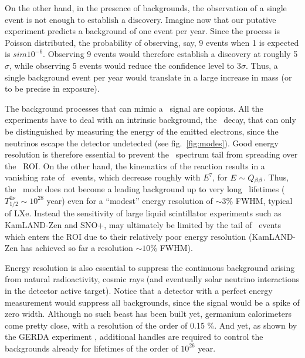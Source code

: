 
On the other hand, in the presence of backgrounds, the observation of a single event is not enough to establish a discovery. Imagine now that our putative  experiment predicts a background of one event per year. Since the process is Poisson distributed, the probability of observing, say, 9 events when 1 is expected is $sim 10^{-6}$. Observing 9 events would therefore establish a discovery at roughly 5$\sigma$, while observing 5 events would reduce the confidence level to 
 3$\sigma$. Thus, a single background event per year would translate in a large increase in mass (or to be precise in exposure).
 
 The background processes that can mimic a \bbonu\ signal 
 are copious. All the experiments have to deal with an intrinsic background, the \bbtnu\ decay, that can only be distinguished by measuring the energy of the emitted electrons, since the neutrinos escape the detector undetected (see fig.~\ref{fig:modes}). Good energy resolution is therefore essential to prevent the \bbtnu\ spectrum tail from spreading over the \bbonu\ ROI. On the other hand, the kinematics of the reaction results in a vanishing rate of \bbtnu\ events, which decrease roughly with $E^7$, for $E \sim Q_{\beta\beta}$. Thus, the \bbtnu\ mode does not become a leading background up to very long \bbonu\ lifetimes  ($T_{1/2}^{0\nu} \sim 10^{28}$ year) even for a ``modest'' energy resolution of $\sim 3\%$ FWHM, typical of LXe. Instead the sensitivity of large liquid scintillator experiments such as KamLAND-Zen and SNO+, may ultimately be limited by the tail of \bbtnu\ events which enters the ROI due to their relatively poor energy resolution (KamLAND-Zen has achieved so far a resolution $\sim 10\%$ FWHM).
 
Energy resolution is also essential to suppress the continuous background arising from natural radioactivity, cosmic rays (and eventually solar neutrino interactions in the detector active target). Notice that a detector with a perfect energy measurement would suppress all backgrounds, since the signal would be a spike of zero width. Although no such beast has been built yet, germanium calorimeters come pretty close, with a resolution of the order of 0.15 \%. And yet, as shown by the GERDA experiment \cite{GERDA:2020xhi}, additional handles are required to control the backgrounds already for lifetimes of the order of  $10^{26}$ year. 
 
